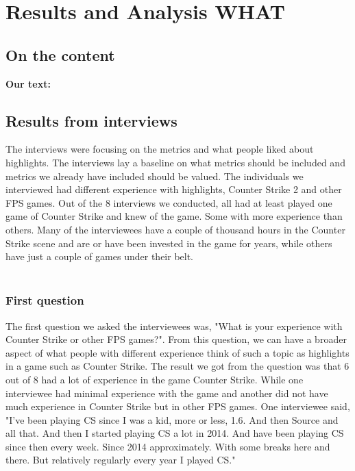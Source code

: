 \chapter{Results and Analysis WHAT}
\label{chp:results}
\section{On the content}
\textbf{Our text:}\\
\section{Results from interviews}

The interviews were focusing on the metrics and what people liked about highlights. The interviews lay a baseline on what metrics should be included and metrics we already have included should be valued. The individuals we interviewed had different experience with highlights, Counter Strike 2 and other FPS games. Out of the 8 interviews we conducted, all had at least played one game of Counter Strike and knew of the game. Some with more experience than others. Many of the interviewees have a couple of thousand hours in the Counter Strike scene and are or have been invested in the game for years, while others have just a couple of games under their belt.\\\\
\subsection{First question}
The first question we asked the interviewees was, "What is your experience with Counter Strike or other FPS games?". From this question, we can have a broader aspect of what people with different experience think of such a topic as highlights in a game such as Counter Strike. The result we got from the question was that 6 out of 8 had a lot of experience in the game Counter Strike. While one interviewee had minimal experience with the game and another did not have much experience in Counter Strike but in other FPS games. One interviewee said, "I've been playing CS since I was a kid, more or less, 1.6. And then Source and all that. And then I started playing CS a lot in 2014. And have been playing CS since then every week. Since 2014 approximately. With some breaks here and there. But relatively regularly every year I played CS."\\\\
